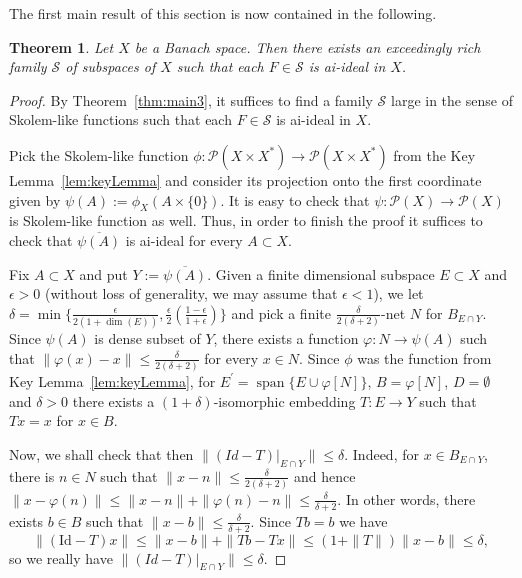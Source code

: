 \documentclass[11pt]{amsart}
\newtheorem{thm}{Theorem}
\theoremstyle{definition}
\theoremstyle{remark}
\newcommand{\PP}{\mathcal P}
\newcommand{\SSS}{\mathcal S}
\newcommand{\Span}{\operatorname{span}}
\begin{document}
The first main result of this section is now contained in the following.

\begin{thm}\label{Thm:ExeedRichFamilyai}Let $X$ be a Banach space. Then there exists an exceedingly rich family $\SSS$ of subspaces of $X$ such that each $F\in \SSS$ is ai-ideal in $X$.
\end{thm}
\begin{proof}By Theorem~\ref{thm:main3}, it suffices to find a family $\SSS$ large in the sense of Skolem-like functions such that  each $F\in \SSS$ is ai-ideal in $X$.

Pick the Skolem-like function $\phi:\PP(X\times X^*)\to \PP(X\times X^*)$ from the Key Lemma~\ref{lem:keyLemma} and consider its projection onto the first coordinate given by $\psi(A):=\phi_X(A\times \{0\})$. It is easy to check that $\psi:\PP(X)\to\PP(X)$ is Skolem-like function as well. Thus, in order to finish the proof it suffices to check that $\overline{\psi(A)}$ is ai-ideal for every $A\subset X$.

Fix $A\subset X$ and put $Y:=\overline{\psi(A)}$. Given a finite dimensional subspace $E\subset X$ and $\epsilon>0$ (without loss of generality, we may assume that $\epsilon<1$), we let $\delta=\min\{\frac{\epsilon}{2(1+\dim(E))},\frac{\epsilon}{2}(\frac{1-\epsilon}{1+\epsilon})\}$ and pick a finite $\frac{\delta}{2(\delta+2)}$-net $N$ for $B_{E\cap Y}$. Since 
$\psi(A)$ is dense subset of $Y$, there exists a function $\varphi:N\to \psi(A)$ such that $\|\varphi(x)-x\|\leq \frac{\delta}{2(\delta+2)}$ for every $x \in N$. Since $\phi$ was the function from Key Lemma~\ref{lem:keyLemma}, for $E^\prime=\Span\{E\cup \varphi[N]\}$, $B=\varphi[N]$, $D=\emptyset$ and $\delta>0$ there exists a $(1+\delta)$-isomorphic embedding $T:E\to Y$ such that $Tx = x$ for $x\in B$.

Now, we shall check that then $\|(Id-T)|_{E\cap Y}\|\leq \delta$. Indeed, for $x\in B_{E\cap Y}$, there is $n\in N$ such that $\|x-n\|\leq\frac{\delta}{2(\delta+2)}$ and hence $\|x-\varphi(n)\|\leq \|x-n\|+\|\varphi(n)-n\|\leq \frac{\delta}{\delta+2}$. In other words, there exists $b \in B$ such that $\|x-b\|\leq  \frac{\delta}{\delta+2}$. Since 
$Tb=b$ we have
\[\|(\mathrm{Id}-T)x\|\leq \|x-b\|+\|Tb-Tx\|\leq (1+\|T\|)\|x-b\|\leq \delta,\]
so we really have $\|(Id-T)|_{E\cap Y}\|\leq \delta$.


\end{proof}
\end{document}
